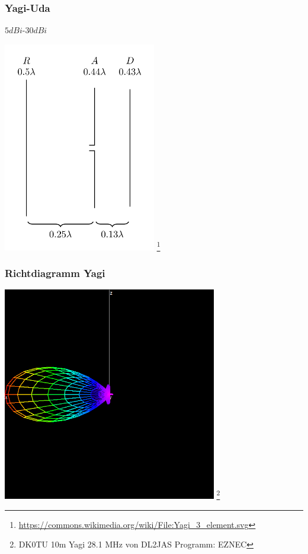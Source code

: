 \begin{frame}
    \frametitle{Yagi-Uda}
    $5dBi$-$30dBi$
    \begin{center}
        \includegraphics[width=0.5\textwidth]{e11/Yagi_3_element.png}
        \footnote{\tiny \url{https://commons.wikimedia.org/wiki/File:Yagi_3_element.svg}}
	\end{center}
\end{frame}


\begin{frame}
    \frametitle{Richtdiagramm Yagi}
    \begin{center}
        \includegraphics[width=0.7\textwidth]{e11/yagi_gain.png}
        \footnote{\tiny DK0TU 10m Yagi 28.1 MHz von DL2JAS Programm: EZNEC}
	\end{center}
\end{frame}

